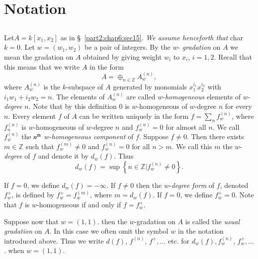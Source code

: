 \section{Notation}\label{part2:chap6:sec16}

\subsection{}\label{part2:chap6:sec16:ss16.1} 

Let\pageoriginale $A= k[x_1, x_2]$ as in
\S\ \ref{part2:chap6:sec15}. {\em We assume henceforth that} char
$k=0$. Let $w= (w_1, w_2)$ be a pair of integers. By the $w$-{\em
  gradation} on $A$ we mean the gradation on $A$ obtained by giving
weight $w_i$ to $x_i$, $i=1,2$. Recall that this means that we write
$A$ in the form
$$
A= \mathop{\oplus}_{n \in \mathbb{Z}} A_w^{(n)},
$$
where $A_w^{(n)}$ is the $k$-subspace of $A$ generated by monomials
$x_1^{i_1} x_2^{i_2}$ with $i_1 w_1 + i_2 w_2=n$. The elements of
$A_w^{(n)}$ are called $w$-{\em homogeneous} elements of $w$-{\em
  degree} $n$. Note that by this definition 0 is $w$-homogeneous of
$w$-degree $n$ for every $n$. Every element $f$ of $A$ can be written
uniquely in the form $\displaystyle{f= \sum_n f_w^{(n)}}$, where
$f_n^{(n)}$ is $w$-homogeneous of $w$-degree $n$ and $f_w^{(n)}=0$
for almost all $n$. We call $f_w^{(n)}$ the $n^{\rm th}$ $w$-{\em homogeneous
  component} of $f$. Suppose $f \neq 0$. Then there exists $m\in
\mathbb{Z}$ such that $f_w^{(m)} \neq 0$ and $f_w^{(n)}=0$ for all $n
> m$. We call this $m$ the $w$-{\em degree} of $f$ and denote it by
$d_w (f)$. Thus
$$
d_w (f) = \sup \left\{ n \in \mathbb{Z} \big| f_w^{(n)} \neq 0 \right\}.
$$

If $f=0$, we define $d_w (f)= - \infty$. If $f \neq 0$ then the
$w$-{\em degree form} of $f$, denoted $f_w^+$, is defined by $f_w^+=
f_w ^{(m)}$, where $m=d_w (f)$. If $f=0$, we define $f_w^+=0$. Note
that $f$ is $w$-homogeneous if and only if $f= f_w^+$. 

Suppose now that $w= (1, 1)$. then the $w$-gradation on $A$ is called
the {\em usual gradation} on $A$. In this case we often omit the
symbol $w$ in the notation introduced above. Thus we write $d(f)$,
$f^{(n)}$, $f^+, \ldots $ etc. for $d_w(f), f_w^{(n)}$, $f_w^+,
\ldots$. when $w= (1, 1)$.

\subsection{}\label{part2:chap6:sec16:ss16.2}

